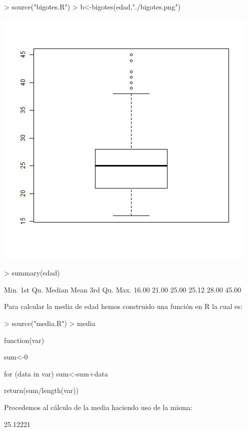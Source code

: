 \documentclass [a4paper] {article}
\begin{document}
\begin{Schunk}
\begin{Sinput}
> source("bigotes.R")
> b<-bigotes(edad,"./bigotes.png")
\end{Sinput}
\end{Schunk}
\includegraphics[width=\textwidth]{bigotes}


\begin{Schunk}
\begin{Sinput}
> summary(edad)
\end{Sinput}
\begin{Soutput}
   Min. 1st Qu.  Median    Mean 3rd Qu.    Max. 
  16.00   21.00   25.00   25.12   28.00   45.00 
\end{Soutput}
\end{Schunk}

\bigskip
Para calcular la media de edad hemos construido una funci\'on en R la cual es:
\begin{Schunk}
\begin{Sinput}
> source("media.R")
> media
\end{Sinput}
\begin{Soutput}
function(var) {
    sum<-0

    for (data in var) {
        sum<-sum+data
    }

    return(sum/length(var))
}
\end{Soutput}
\end{Schunk}

\bigskip
Procedemos al c\'alculo de la media haciendo uso de la misma:
\begin{Schunk}
\begin{Soutput}
[1] 25.12221
\end{Soutput}
\end{Schunk}
\end{document}
